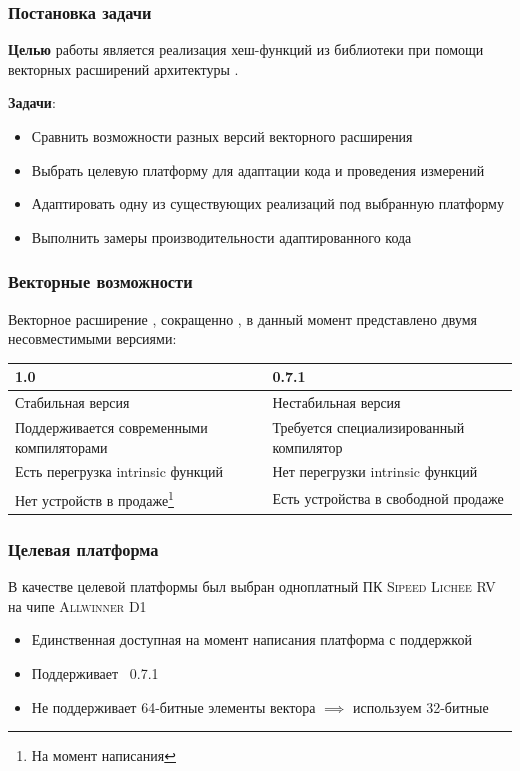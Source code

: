 \documentclass[aspectratio=169]{beamer}
\begin{document}
\begin{frame}
	\frametitle{Постановка задачи}
	\textbf{Целью} работы является реализация хеш-функций из библиотеки \xxHash{} при помощи векторных расширений архитектуры \riscv{}.

	\textbf{Задачи}:
	\begin{itemize}
		\item Сравнить возможности разных версий векторного расширения \riscv{}
		\item Выбрать целевую платформу для адаптации кода и проведения измерений
		\item Адаптировать одну из существующих реализаций под выбранную платформу
		\item Выполнить замеры производительности адаптированного кода
	\end{itemize}
\end{frame}

\begin{frame}
	\frametitle{Векторные возможности \riscv{}}

	Векторное расширение \riscv{}, сокращенно \rvv{}, в данный момент представлено двумя несовместимыми версиями:
	\begin{center}
		\begin{tabularx}{0.8\linewidth}{XX}
			\toprule
			\rvv{} 1.0 & \rvv{} 0.7.1 \\ \midrule
			Стабильная версия & Нестабильная версия \\ \midrule
			Поддерживается современными компиляторами & Требуется специализированный компилятор \\ \midrule
			Есть перегрузка intrinsic функций & Нет перегрузки intrinsic функций \\ \midrule
			Нет устройств в продаже\footnote{На момент написания} & Есть устройства в свободной продаже \\
			\bottomrule
		\end{tabularx}
	\end{center}
\end{frame}

\begin{frame}
	\frametitle{Целевая платформа}

	В качестве целевой платформы был выбран одноплатный ПК \textsc{Sipeed Lichee RV} на чипе \textsc{Allwinner D1}
	\begin{itemize}
		\item Единственная доступная на момент написания платформа с поддержкой \rvv{}
		\item Поддерживает \rvv{}~0.7.1
		\item Не поддерживает 64-битные элементы вектора $\implies$ используем 32-битные
	\end{itemize}

\end{frame}
\end{document}

